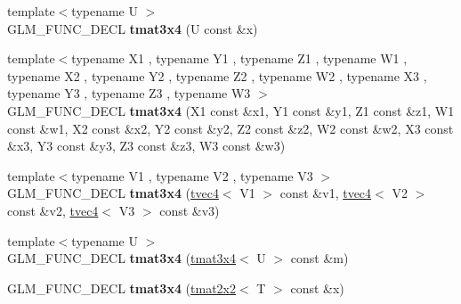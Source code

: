 \begin{DoxyCompactItemize}
\item 
\hypertarget{structglm_1_1detail_1_1tmat3x4_a8646de527d6da9c9c6677f63fee87a5a}{{\footnotesize template$<$typename U $>$ }\\\-G\-L\-M\-\_\-\-F\-U\-N\-C\-\_\-\-D\-E\-C\-L {\bfseries tmat3x4} (\-U const \&x)}\label{structglm_1_1detail_1_1tmat3x4_a8646de527d6da9c9c6677f63fee87a5a}

\item 
\hypertarget{structglm_1_1detail_1_1tmat3x4_a79731d96e3616675c81636a16ddffa38}{{\footnotesize template$<$typename X1 , typename Y1 , typename Z1 , typename W1 , typename X2 , typename Y2 , typename Z2 , typename W2 , typename X3 , typename Y3 , typename Z3 , typename W3 $>$ }\\\-G\-L\-M\-\_\-\-F\-U\-N\-C\-\_\-\-D\-E\-C\-L {\bfseries tmat3x4} (\-X1 const \&x1, \-Y1 const \&y1, \-Z1 const \&z1, \-W1 const \&w1, \-X2 const \&x2, \-Y2 const \&y2, \-Z2 const \&z2, \-W2 const \&w2, \-X3 const \&x3, \-Y3 const \&y3, \-Z3 const \&z3, \-W3 const \&w3)}\label{structglm_1_1detail_1_1tmat3x4_a79731d96e3616675c81636a16ddffa38}

\item 
\hypertarget{structglm_1_1detail_1_1tmat3x4_a6c89bd96cf630d7f6053e2239ddf240d}{{\footnotesize template$<$typename V1 , typename V2 , typename V3 $>$ }\\\-G\-L\-M\-\_\-\-F\-U\-N\-C\-\_\-\-D\-E\-C\-L {\bfseries tmat3x4} (\hyperlink{structglm_1_1detail_1_1tvec4}{tvec4}$<$ \-V1 $>$ const \&v1, \hyperlink{structglm_1_1detail_1_1tvec4}{tvec4}$<$ \-V2 $>$ const \&v2, \hyperlink{structglm_1_1detail_1_1tvec4}{tvec4}$<$ \-V3 $>$ const \&v3)}\label{structglm_1_1detail_1_1tmat3x4_a6c89bd96cf630d7f6053e2239ddf240d}

\item 
\hypertarget{structglm_1_1detail_1_1tmat3x4_a80093e032a833f71909c1f1afcb983e8}{{\footnotesize template$<$typename U $>$ }\\\-G\-L\-M\-\_\-\-F\-U\-N\-C\-\_\-\-D\-E\-C\-L {\bfseries tmat3x4} (\hyperlink{structglm_1_1detail_1_1tmat3x4}{tmat3x4}$<$ \-U $>$ const \&m)}\label{structglm_1_1detail_1_1tmat3x4_a80093e032a833f71909c1f1afcb983e8}

\item 
\hypertarget{structglm_1_1detail_1_1tmat3x4_a3488e8e002728294342554bfc8ce9427}{\-G\-L\-M\-\_\-\-F\-U\-N\-C\-\_\-\-D\-E\-C\-L {\bfseries tmat3x4} (\hyperlink{structglm_1_1detail_1_1tmat2x2}{tmat2x2}$<$ \-T $>$ const \&x)}\label{structglm_1_1detail_1_1tmat3x4_a3488e8e002728294342554bfc8ce9427}


\end{DoxyCompactItemize}
